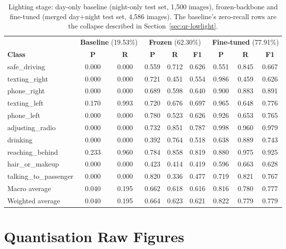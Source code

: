 \begin{table}[H]
\centering
\caption{Lighting stage: day-only baseline (night-only test set, 1{,}500 images), frozen-backbone and fine-tuned (merged day+night test set, 4{,}586 images). The baseline's zero-recall rows are the collapse described in Section~\ref{sec:qr-lowlight}.}
\label{tab:app-lowlight}
\footnotesize
\begin{tabular}{lcccccccc}
\toprule
& \multicolumn{2}{c}{\textbf{Baseline} (19.53\%)} & \multicolumn{3}{c}{\textbf{Frozen} (62.30\%)} & \multicolumn{3}{c}{\textbf{Fine-tuned} (77.91\%)} \\
\cmidrule(lr){2-3}\cmidrule(lr){4-6}\cmidrule(lr){7-9}
\textbf{Class} & \textbf{P} & \textbf{R} & \textbf{P} & \textbf{R} & \textbf{F1} & \textbf{P} & \textbf{R} & \textbf{F1} \\
\midrule
safe\_driving & 0.000 & 0.000 & 0.559 & 0.712 & 0.626 & 0.551 & 0.845 & 0.667 \\
texting\_right & 0.000 & 0.000 & 0.721 & 0.451 & 0.554 & 0.986 & 0.459 & 0.626 \\
phone\_right & 0.000 & 0.000 & 0.689 & 0.598 & 0.640 & 0.900 & 0.883 & 0.891 \\
texting\_left & 0.170 & 0.993 & 0.720 & 0.676 & 0.697 & 0.965 & 0.648 & 0.776 \\
phone\_left & 0.000 & 0.000 & 0.780 & 0.523 & 0.626 & 0.926 & 0.653 & 0.765 \\
adjusting\_radio & 0.000 & 0.000 & 0.732 & 0.851 & 0.787 & 0.998 & 0.960 & 0.979 \\
drinking & 0.000 & 0.000 & 0.392 & 0.764 & 0.518 & 0.638 & 0.889 & 0.743 \\
reaching\_behind & 0.233 & 0.960 & 0.784 & 0.858 & 0.819 & 0.880 & 0.975 & 0.925 \\
hair\_or\_makeup & 0.000 & 0.000 & 0.423 & 0.414 & 0.419 & 0.596 & 0.663 & 0.628 \\
talking\_to\_passenger & 0.000 & 0.000 & 0.820 & 0.336 & 0.477 & 0.719 & 0.821 & 0.767 \\
\midrule
Macro average & 0.040 & 0.195 & 0.662 & 0.618 & 0.616 & 0.816 & 0.780 & 0.777 \\
Weighted average & 0.040 & 0.195 & 0.664 & 0.623 & 0.621 & 0.822 & 0.779 & 0.779 \\
\bottomrule
\end{tabular}
\end{table}

\chapter{Quantisation Raw Figures}
\label{app:quant}

